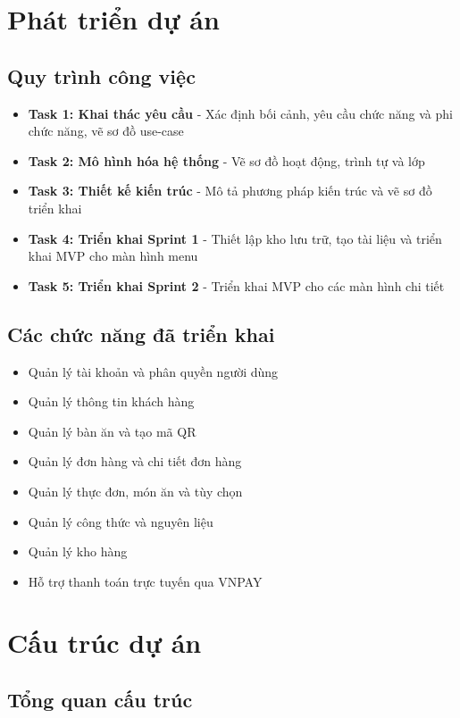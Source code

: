 \documentclass[a4paper]{article}
\begin{document}
\section{Phát triển dự án}
    \subsection{Quy trình công việc}
    \begin{itemize}
        \item \textbf{Task 1: Khai thác yêu cầu} - Xác định bối cảnh, yêu cầu chức năng và phi chức năng, vẽ sơ đồ use-case
        \item \textbf{Task 2: Mô hình hóa hệ thống} - Vẽ sơ đồ hoạt động, trình tự và lớp
        \item \textbf{Task 3: Thiết kế kiến trúc} - Mô tả phương pháp kiến trúc và vẽ sơ đồ triển khai
        \item \textbf{Task 4: Triển khai Sprint 1} - Thiết lập kho lưu trữ, tạo tài liệu và triển khai MVP cho màn hình menu
        \item \textbf{Task 5: Triển khai Sprint 2} - Triển khai MVP cho các màn hình chi tiết
    \end{itemize}
    
    \subsection{Các chức năng đã triển khai}
    \begin{itemize}
        \item Quản lý tài khoản và phân quyền người dùng
        \item Quản lý thông tin khách hàng
        \item Quản lý bàn ăn và tạo mã QR
        \item Quản lý đơn hàng và chi tiết đơn hàng
        \item Quản lý thực đơn, món ăn và tùy chọn
        \item Quản lý công thức và nguyên liệu
        \item Quản lý kho hàng
        \item Hỗ trợ thanh toán trực tuyến qua VNPAY
    \end{itemize}


\newpage
\section{Cấu trúc dự án}
\subsection{Tổng quan cấu trúc}
\end{document}
